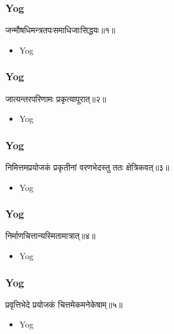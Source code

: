 \begin{frame}[fragile]\frametitle{Yog}
\begin{sanskrit}
जन्मौषधिमन्त्रतपःसमाधिजाःसिद्धयः॥१॥
\end{sanskrit}
	\begin{itemize}
	\item Yog 
	\end{itemize}
\end{frame}


\begin{frame}[fragile]\frametitle{Yog}
\begin{sanskrit}
जात्यन्तरपरिणामः प्रकृत्यापूरात्॥२॥
\end{sanskrit}
	\begin{itemize}
	\item Yog 
	\end{itemize}
\end{frame}

\begin{frame}[fragile]\frametitle{Yog}
\begin{sanskrit}
निमित्तमप्रयोजकं प्रकृतीनां वरणभेदस्तु ततः क्षेत्रिकवत्॥३॥
\end{sanskrit}
	\begin{itemize}
	\item Yog 
	\end{itemize}
\end{frame}



\begin{frame}[fragile]\frametitle{Yog}
\begin{sanskrit}
निर्माणचित्तान्यस्मितामात्रात्॥४॥
\end{sanskrit}
	\begin{itemize}
	\item Yog 
	\end{itemize}
\end{frame}


\begin{frame}[fragile]\frametitle{Yog}
\begin{sanskrit}
प्रवृत्तिभेदे प्रयोजकं चित्तमेकमनेकेषाम्॥५॥
\end{sanskrit}
	\begin{itemize}
	\item Yog 
	\end{itemize}
\end{frame}


